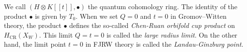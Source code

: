 \documentclass[11pt]{amsart}
\theoremstyle{definition} %
\theoremstyle{remark} %
\newcommand{\CC}{\mathbb C}
\def\CR{\operatorname{\text{CR}}}
\renewcommand{\CR}{{\operatorname{CR}}}
\newcommand{\Eff}{\operatorname{Eff}}
\begin{document}
We call $(H\otimes K[\![t]\!], \bullet)$ the 
quantum cohomology ring. 
The identity of the product $\bullet$ 
is given by $T_0$. 
When we set $Q=0$ and $t=0$ in Gromov--Witten theory, 
the product $\bullet$ defines the so-called \emph{Chen-Ruan 
orbifold cup product} on $H_{\CR}(X_W)$.  
This limit $Q=t=0$ is called the \emph{large radius limit}. 
On the other hand, the limit point $t=0$ in FJRW theory 
is called the \emph{Landau-Ginzburg point}. 
\end{document}
